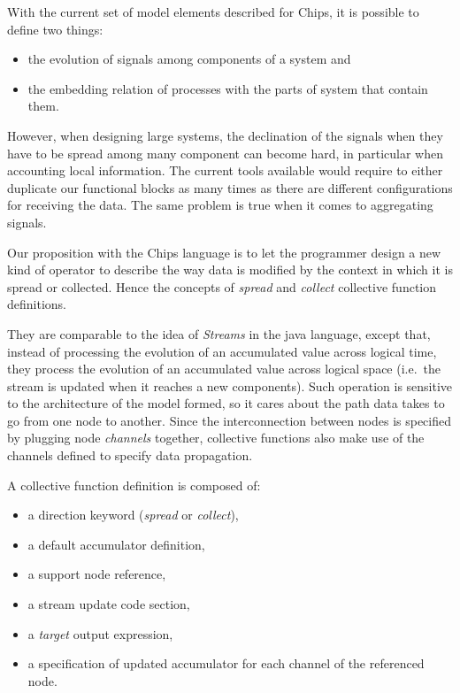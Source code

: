 \documentclass{article}
\begin{document}
With the current set of model elements described for Chips, it is possible to define two things:
\begin{itemize}
    \item the evolution of signals among components of a system and
    \item the embedding relation of processes with the parts of system that contain them.
\end{itemize}

However, when designing large systems, the declination of the signals when they have to be spread among many component can become hard, in particular when accounting local information. The current tools available would require to either duplicate our functional blocks as many times as there are different configurations for receiving the data. The same problem is true when it comes to aggregating signals.

Our proposition with the Chips language is to let the programmer design a new kind of operator to describe the way data is modified by the context in which it is spread or collected. Hence the concepts of \emph{spread} and \emph{collect} collective function definitions.

They are comparable to the idea of \emph{Streams} in the java language, except that, instead of processing the evolution of an accumulated value across logical time, they process the evolution of an accumulated value across logical space (i.e.~the stream is updated when it reaches a new components). Such operation is sensitive to the architecture of the model formed, so it cares about the path data takes to go from one node to another. Since the interconnection between nodes is specified by plugging node \emph{channels} together, collective functions also make use of the channels defined to specify data propagation.

A collective function definition is composed of:
\begin{itemize}
    \item a direction keyword (\emph{spread} or \emph{collect}),
    \item a default accumulator definition,
    \item a support node reference,
    \item a stream update code section,
    \item a \emph{target} output expression,
    \item a specification of updated accumulator for each channel of the referenced node.
\end{itemize}
\end{document}
